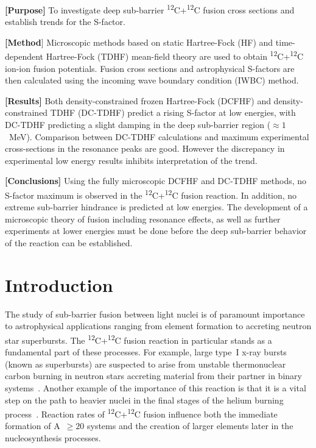 		{\bf [Purpose]} To investigate deep sub-barrier \textsuperscript{12}C+\textsuperscript{12}C fusion cross sections and establish trends for the S-factor.
		
		{\bf [Method}] Microscopic methods based on static Hartree-Fock (HF) and time-dependent Hartree-Fock (TDHF) mean-field theory are used to obtain \textsuperscript{12}C+\textsuperscript{12}C ion-ion fusion potentials. Fusion cross sections and astrophysical S-factors are then calculated using the incoming wave boundary condition (IWBC) method.
		
		{\bf [Results]} Both density-constrained frozen Hartree-Fock (DCFHF) and density-constrained TDHF (DC-TDHF) predict a rising S-factor at low energies, with DC-TDHF predicting a slight damping in the deep sub-barrier region ($\approx1$~MeV). Comparison between  DC-TDHF calculations and maximum experimental cross-sections in the resonance peaks are good. However the discrepancy in experimental low energy results inhibits interpretation of the trend.
		
		{\bf [Conclusions]} Using the fully microscopic DCFHF and DC-TDHF methods, no S-factor maximum is observed in the \textsuperscript{12}C+\textsuperscript{12}C fusion reaction. In addition, no extreme sub-barrier hindrance is predicted at low energies. The development of a microscopic theory of fusion including resonance effects, as well as further experiments at lower energies must be done before the deep sub-barrier behavior of the reaction can be established. 


\section{Introduction}
\label{sec:intro}
The study of sub-barrier fusion between light nuclei is of paramount importance to astrophysical applications ranging from element formation to accreting neutron star superbursts.
The \textsuperscript{12}C+\textsuperscript{12}C fusion reaction in particular stands as a fundamental part of these processes.
For example, large type~I x-ray bursts (known as superbursts) are suspected to arise from unstable thermonuclear carbon burning in neutron stars accreting material from their partner in binary systems~\citep{cumming2001,strohmayer2002}.
Another example of the importance of this reaction is that it is  a vital step on the path to heavier nuclei in the final stages of the helium burning process~\citep{hoyle1954}.
Reaction rates of \textsuperscript{12}C+\textsuperscript{12}C fusion influence both the immediate formation of A~$\geq 20$ systems and the creation of larger elements later in the nucleosynthesis processes.

